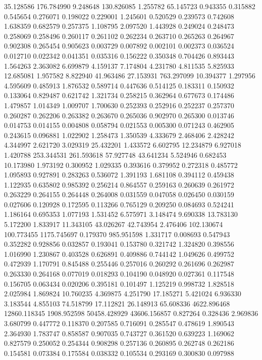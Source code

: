 35.128586
176.784990
9.248648
130.826085
1.255782
65.145723
0.943355
0.315882
0.545654
0.276071
0.198022
0.229001
1.245601
0.520529
0.239573
0.742608
1.638359
0.682579
0.257375
1.108795
2.097520
1.443928
0.249024
0.248473
0.258069
0.258496
0.260117
0.261102
0.262234
0.263710
0.265263
0.264967
0.902308
0.265454
0.905623
0.003729
0.007892
0.002101
0.002373
0.036524
0.012710
0.022342
0.041351
0.035316
0.156222
0.350348
0.704426
0.893443
1.564263
2.363082
6.699879
4.159137
7.174804
4.231780
4.811535
5.825933
12.685081
1.957582
8.822940
41.963486
27.153931
763.297099
10.394377
1.297956
4.595609
0.485913
1.876532
0.589714
0.447636
0.514125
0.183311
0.150932
0.133064
0.829487
0.621742
1.321734
0.258215
0.362964
0.677673
0.174486
1.479857
1.014349
1.009707
1.700630
0.252393
0.252916
0.252237
0.257370
0.260287
0.262206
0.263382
0.263670
0.265036
0.902970
0.265300
0.013746
0.014753
0.014155
0.004808
0.058794
0.021553
0.005300
0.071243
0.462905
0.243615
0.096881
1.022902
1.258473
1.350539
4.333679
2.468406
2.428242
4.344997
2.621720
3.029319
25.432201
1.433572
6.602795
12.234879
6.927018
1.420788
253.344531
261.593618
57.927748
43.641234
5.524946
0.682453
10.173980
1.973192
0.300952
1.029335
0.393616
0.379952
0.272318
0.485772
1.095893
0.927891
0.283263
0.536072
1.391193
1.681108
0.394112
0.459438
1.122935
0.635802
0.985392
0.256214
0.864557
0.259163
0.260639
0.261972
0.263229
0.264155
0.264448
0.264008
0.031559
0.047058
0.026450
0.030159
0.027606
0.120928
0.172595
0.113266
0.765129
0.209250
0.084693
0.524241
1.186164
0.695353
1.077193
1.531452
6.575971
3.148474
9.690338
13.783130
5.172200
1.833917
11.343105
43.026267
42.743954
2.476406
102.130674
100.773455
1175.745697
0.179370
985.951598
1.331717
0.008693
0.547943
0.352282
0.928856
0.032857
0.193041
0.153780
0.321742
1.324820
0.398556
1.016990
1.230867
0.403528
0.626891
0.409886
0.744142
1.049626
0.499752
0.472939
1.170791
0.845488
0.255446
0.257016
0.260292
0.261696
0.262987
0.263330
0.264168
0.077019
0.018293
0.104190
0.048920
0.027361
0.117548
0.156705
0.063434
0.020206
0.395181
0.101497
1.125219
0.998732
1.828518
2.025984
1.869824
10.760235
4.369875
4.251790
17.185271
5.421024
6.936330
3.183544
4.855103
74.518799
17.112821
26.148913
65.608336
4622.896468
12860.118345
1908.952598
50458.428929
43606.156857
0.827264
0.328436
2.969836
3.680799
0.447772
0.118370
0.207585
0.716091
0.285547
0.478619
1.890543
2.364930
1.783747
0.858587
0.907035
0.743727
0.361520
0.639223
1.169062
0.827579
0.250052
0.254344
0.908298
0.257136
0.260895
0.262748
0.262186
0.154581
0.073384
0.175584
0.038332
0.105534
0.293169
0.300830
0.097988
